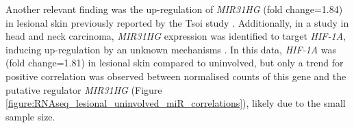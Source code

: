 


Another relevant finding was the up-regulation of \textit{MIR31HG} (fold change=1.84) in lesional skin previously reported by the Tsoi study \parencite{Tsoi2015}. Additionally, in a study in head and neck carcinoma, \textit{MIR31HG} expression was identified to target \textit{HIF-1A}, inducing up-regulation by an unknown mechanisms \parencite{Wang2018}. In this data, \textit{HIF-1A} was (fold change=1.81) in lesional skin compared to uninvolved, but only a trend for positive correlation was observed between normalised counts of this gene and the putative regulator \textit{MIR31HG} (Figure \ref{figure:RNAseq_lesional_uninvolved_miR_correlations}), likely due to the small sample size.


